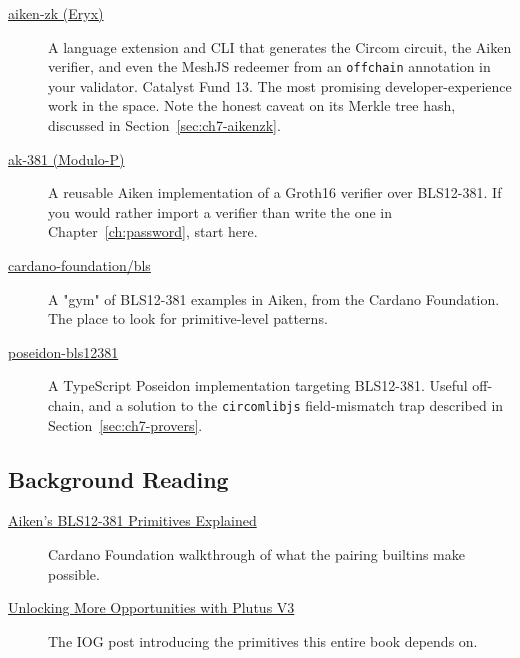 \begin{description}
  \item[\href{https://github.com/eryxcoop/cardano-zk-aiken}{aiken-zk (Eryx)}]
    A language extension and CLI that generates the Circom circuit, the Aiken
    verifier, and even the MeshJS redeemer from an \texttt{offchain}
    annotation in your validator. Catalyst Fund 13. The most promising
    developer-experience work in the space. Note the honest caveat on its
    Merkle tree hash, discussed in Section~\ref{sec:ch7-aikenzk}.

  \item[\href{https://github.com/Modulo-P/ak-381}{ak-381 (Modulo-P)}]
    A reusable Aiken implementation of a Groth16 verifier over BLS12-381. If
    you would rather import a verifier than write the one in
    Chapter~\ref{ch:password}, start here.

  \item[\href{https://github.com/cardano-foundation/bls}{cardano-foundation/bls}]
    A "gym" of BLS12-381 examples in Aiken, from the Cardano Foundation. The
    place to look for primitive-level patterns.

  \item[\href{https://github.com/jmagan/poseidon-bls12381}{poseidon-bls12381}]
    A TypeScript Poseidon implementation targeting BLS12-381. Useful
    off-chain, and a solution to the \texttt{circomlibjs} field-mismatch trap
    described in Section~\ref{sec:ch7-provers}.
\end{description}

\subsection*{Background Reading}

\begin{description}
  \item[\href{https://cardanofoundation.org/blog/aiken-primitives-explained}{Aiken's BLS12-381 Primitives Explained}]
    Cardano Foundation walkthrough of what the pairing builtins make possible.

  \item[\href{https://iohk.io/en/blog/posts/2024/02/12/unlocking-more-opportunities-with-plutus-v3/}{Unlocking More Opportunities with Plutus V3}]
    The IOG post introducing the primitives this entire book depends on.
\end{description}


